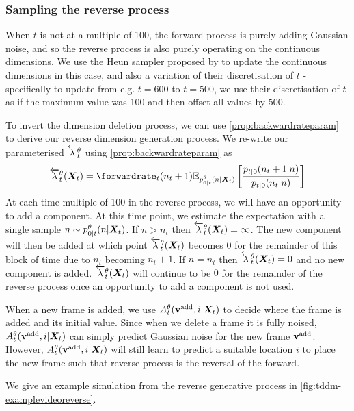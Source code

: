 \subsubsection{Sampling the reverse process}

When $t$ is not at a multiple of 100, the forward process is purely adding Gaussian noise, and so the reverse process is also purely operating on the continuous dimensions. We use the Heun sampler proposed by \citet{karras2022elucidating} to update the continuous dimensions in this case, and also a variation of their discretisation of $t$ - specifically to update from e.g. $t=600$ to $t=500$, we use their discretisation of $t$ as if the maximum value was 100 and then offset all values by $500$. 

To invert the dimension deletion process, we can use \cref{prop:backwardrateparam} to derive our reverse dimension generation process. We re-write our parameterised $\overleftarrow{\lambda}_t^\theta$ using \cref{prop:backwardrateparam} as 
\begin{equation}
    \backwardrate_t^\theta(\mX_t) = \forwardrate_t(n_t + 1) \mathbb{E}_{p_{0|t}^\theta(n | \mX_t)} \left[ \frac{p_{t|0}(n_t + 1 | n)}{p_{t|0}(n_t | n)}\right]
\end{equation}
At each time multiple of 100 in the reverse process, we will have an opportunity to add a component. At this time point, we estimate the expectation with a single sample $n \sim p_{0|t}^\theta(n | {\bm{X}}_t)$. If $n > n_t$ then $\overleftarrow{\lambda}_t^\theta({\bm{X}}_t) = \infty$. The new component will then be added at which point $\overleftarrow{\lambda}_t^\theta({\bm{X}}_t)$ becomes $0$ for the remainder of this block of time due to $n_t$ becoming $n_t+1$. If $n = n_t$ then $\overleftarrow{\lambda}_t^\theta({\bm{X}}_t) = 0$ and no new component is added. $\overleftarrow{\lambda}_t^\theta({\bm{X}}_t)$ will continue to be $0$ for the remainder of the reverse process once an opportunity to add a component is not used.

When a new frame is added, we use $A_t^\theta({\mathbf{v}}^{\textup{add}}, i | {\bm{X}}_t)$ to decide where the frame is added and its initial value. Since when we delete a frame it is fully noised, $A_t^\theta({\mathbf{v}}^{\textup{add}}, i | {\bm{X}}_t)$ can simply predict Gaussian noise for the new frame ${\mathbf{v}}^{\textup{add}}$. However, $A_t^\theta({\mathbf{v}}^{\textup{add}}, i | {\bm{X}}_t)$ will still learn to predict a suitable location $i$ to place the new frame such that reverse process is the reversal of the forward.

We give an example simulation from the reverse generative process in \cref{fig:tddm-examplevideoreverse}.

